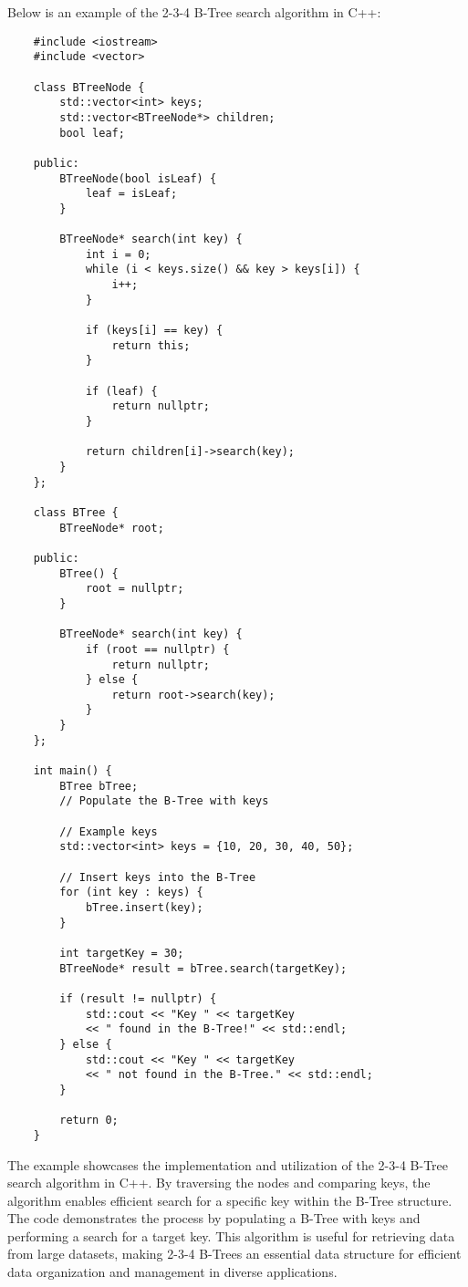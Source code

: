 \begin{solution}
    Below is an example of the 2-3-4 B-Tree search algorithm in C++:

    \horizontalline

    \begin{verbatim}
    #include <iostream>
    #include <vector>
    
    class BTreeNode {
        std::vector<int> keys;
        std::vector<BTreeNode*> children;
        bool leaf;
    
    public:
        BTreeNode(bool isLeaf) {
            leaf = isLeaf;
        }
    
        BTreeNode* search(int key) {
            int i = 0;
            while (i < keys.size() && key > keys[i]) {
                i++;
            }
    
            if (keys[i] == key) {
                return this;
            }
    
            if (leaf) {
                return nullptr;
            }
    
            return children[i]->search(key);
        }
    };
    
    class BTree {
        BTreeNode* root;
    
    public:
        BTree() {
            root = nullptr;
        }
    
        BTreeNode* search(int key) {
            if (root == nullptr) {
                return nullptr;
            } else {
                return root->search(key);
            }
        }
    };
    
    int main() {
        BTree bTree;
        // Populate the B-Tree with keys
    
        // Example keys
        std::vector<int> keys = {10, 20, 30, 40, 50};
        
        // Insert keys into the B-Tree
        for (int key : keys) {
            bTree.insert(key);
        }
    
        int targetKey = 30;
        BTreeNode* result = bTree.search(targetKey);
        
        if (result != nullptr) {
            std::cout << "Key " << targetKey 
            << " found in the B-Tree!" << std::endl;
        } else {
            std::cout << "Key " << targetKey 
            << " not found in the B-Tree." << std::endl;
        }
    
        return 0;
    }
    \end{verbatim}

    \horizontalline

    The example showcases the implementation and utilization of the 2-3-4 B-Tree search algorithm in C++. By traversing the nodes and comparing keys, the algorithm enables efficient search for a specific key within the B-Tree structure. The code demonstrates the process by populating a B-Tree with keys and performing a search for a target key. 
    This algorithm is useful for retrieving data from large datasets, making 2-3-4 B-Trees an essential data structure for efficient data organization and management in diverse applications.
\end{solution}

